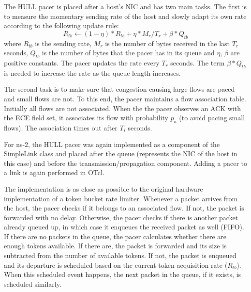 \documentclass[10pt,conference,compsocconf]{IEEEtran}
\begin{document}
The HULL pacer is placed after a host's NIC and has two main tasks. The first is to measure the momentary sending rate of the host and slowly adapt its own rate according to the following update rule: 
\begin{equation*}
\label{rate}
R_{tb} \leftarrow (1-\eta)*R_{tb}+\eta*M_r/T_r+\beta*Q_{tb}
\end{equation*}
where $R_{tb}$ is the sending rate, $M_r$ is the number of bytes received in the last $T_r$ seconds, $Q_{tb}$ is the number of bytes that the pacer has in its queue and $\eta$, $\beta$ are positive constants. The pacer updates the rate every $T_r$ seconds. The term $\beta*Q_{tb}$ is needed to increase the rate as the queue length increases.

The second task is to make sure that congestion-causing large flows are paced and small flows are not. To this end, the pacer maintains a flow association table. Initially all flows are not associated. When the the pacer observes an ACK with the ECE field set, it associates its flow with probability $p_a$ (to avoid pacing small flows). The association times out after $T_i$ seconds.

For ns-2, the HULL pacer was again implemented as a component of the SimpleLink class and placed after the queue (represents the NIC of the host in this case) and before the transmission/propagation component. Adding a pacer to a link is again performed in OTcl.

The implementation is as close as possible to the original hardware implementation of a token bucket rate limiter. Whenever a packet arrives from the host, the pacer checks if it belongs to an associated flow. If not, the packet is forwarded with no delay. Otherwise, the pacer checks if there is another packet already queued up, in which case it enqueues the received packet as well (FIFO). If there are no packets in the queue, the pacer calculates whether there are enough tokens available. If there are, the packet is forwarded and its size is subtracted from the number of available tokens. If not, the packet is enqueued and its departure is scheduled based on the current token acquisition rate ($R_{tb}$). When this scheduled event happens, the next packet in the queue, if it exists, is scheduled similarly. 
\end{document}
